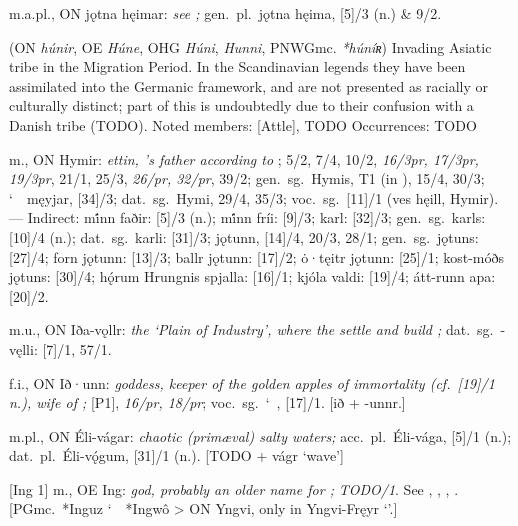 \begin{itemize}
 m.a.pl., ON jǫtna hęimar:
  \emph{see ;} gen.~pl.~jǫtna hęima, [5]/3 (n.) \& 9/2.

 (ON \emph{húnir}, OE \emph{Húne}, OHG \emph{Húni}, \emph{Hunni}, PNWGmc. \emph{*húníʀ})
  Invading Asiatic tribe in the Migration Period.  In the Scandinavian legends they have been assimilated into the Germanic framework, and are not presented as racially or culturally distinct; part of this is undoubtedly due to their confusion with a Danish tribe (TODO).
  Noted members: [Attle], TODO
  Occurrences: TODO

 m., ON Hymir:
  \emph{ettin, ’s father according to }; 5/2, 7/4, 10/2, \emph{16/3pr, 17/3pr, 19/3pr}, 21/1, 25/3, \emph{26/pr, 32/pr}, 39/2; gen.~sg.~Hymis,  T1 (in \AM), 15/4, 30/3; \char`~\ męyjar, [34]/3; dat.~sg.~Hymi,  29/4, 35/3; voc.~sg.~[11]/1 (ves hęill, Hymir).
  --- Indirect: mi̇́nn faðir: [5]/3 (n.); mi̇́nn fríi: [9]/3; karl: [32]/3; gen.~sg.~karls: [10]/4 (n.); dat.~sg.~karli: [31]/3; %
  jǫtunn, [14]/4, 20/3, 28/1; gen.~sg.~jǫtuns: [27]/4; forn jǫtunn: [13]/3; ballr jǫtunn: [17]/2; ȯ·tęitr jǫtunn: [25]/1; kost-móðs jǫtuns: [30]/4; %
  hǫ́rum Hrungnis spjalla: [16]/1; kjóla valdi: [19]/4; átt-runn apa: [20]/2.

 m.u., ON Iða-vǫllr:
  \emph{the ‘Plain of Industry’, where the  settle and build ;} dat.~sg.~-vęlli: [7]/1, 57/1.

 f.i., ON Ið·unn:
  \emph{goddess, keeper of the golden apples of immortality (cf.~[19]/1 n.), wife of ;} [P1], \emph{16/pr, 18/pr}; voc.~sg.~\char`~, [17]/1. [ið + -unnr.]

 m.pl., ON Éli-vágar:
  \emph{chaotic (primæval) salty waters;} acc.~pl.~Éli-vága, [5]/1 (n.); dat.~pl.~Éli-vǫ́gum, [31]/1 (n.).
  [TODO + vágr ‘wave’]

[Ing 1] m., OE Ing:
  \emph{god, probably an older name for ;}  \emph{TODO/1}.
  See , , , .
  [PGmc.~*Inguz \char`~\ *Ingwô > ON Yngvi, only in Yngvi-Fręyr ‘’.]


\end{itemize}
